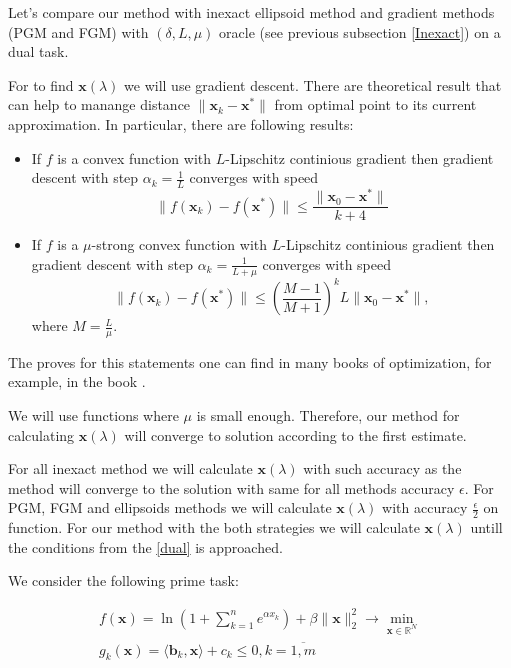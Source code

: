 \documentclass[12pt]{article}
\begin{document}
Let's compare our method with inexact ellipsoid method and gradient methods (PGM and FGM) with $(\delta, L,\mu)$ oracle (see previous subsection \ref{Inexact}) on a dual task.

For to find $\textbf{x}(\lambda)$ we will use gradient descent. There are theoretical result that can help to manange distance $\|\textbf{x}_k-\textbf{x}^*\|$ from optimal point to its current approximation. In particular, there are following results:
\begin{itemize}
\item If $f$ is a convex function with $L$-Lipschitz continious gradient then gradient descent with step $\alpha_k = \frac{1}{L}$ converges with speed
$$\|f(\textbf{x}_k)-f(\textbf{x}^*)\|\leq \frac{\|\textbf{x}_0-\textbf{x}^*\|}{k+4}$$
\item If $f$ is a $\mu$-strong convex function with $L$-Lipschitz continious gradient then gradient descent with step $\alpha_k = \frac{1}{L+\mu}$ converges with speed
$$\|f(\textbf{x}_k)-f(\textbf{x}^*)\|\leq \left(\frac{M-1}{M+1}\right)^kL\|\textbf{x}_0-\textbf{x}^*\|,$$
where $M =\frac{L}{\mu}$.
\end{itemize}

The proves for this statements one can find in many books of optimization, for example, in the book \cite{Polyak}.

We will use functions where $\mu$ is small enough. Therefore, our method for calculating $\textbf{x}(\lambda)$ will converge to solution according to the first estimate.

For all inexact method we will calculate $\textbf{x}(\lambda)$ with such accuracy as the method will converge to the solution with same for all methods accuracy $\epsilon$. For PGM, FGM and ellipsoids methods we will calculate $\textbf{x}(\lambda)$ with accuracy $\frac{\epsilon}{2}$ on function. For our method with the both strategies we will calculate $\textbf{x}(\lambda)$ untill the conditions from the \ref{dual} is approached.


We consider the following prime task:

\begin{gather}
\label{prime}
f(\textbf{x}) = \ln \left(1+\sum_{k=1}^ne^{\alpha x_k}\right) + \beta\|\textbf{x}\|_2^2\rightarrow \min\limits_{\textbf{x}\in \mathbb{R}^N}\\
g_k(\textbf{x}) = \langle \textbf{b}_k, \textbf{x}\rangle+c_k\leq0, k = \overline{1,m}\\
\end{gather}
\end{document}
